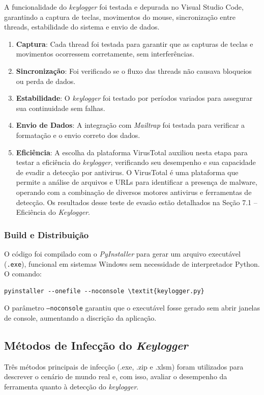 \documentclass[12pt]{article}
\begin{document}
A funcionalidade do \textit{keylogger} foi testada e depurada no Visual Studio Code, garantindo a captura de teclas, movimentos do mouse, sincronização entre threads, estabilidade do sistema e envio de dados.

\begin{enumerate}
    \item \textbf{Captura}: Cada thread foi testada para garantir que as capturas de teclas e movimentos ocorressem corretamente, sem interferências.
    \item \textbf{Sincronização}: Foi verificado se o fluxo das threads não causava bloqueios ou perda de dados.
    \item \textbf{Estabilidade}: O \textit{keylogger} foi testado por períodos variados para assegurar sua continuidade sem falhas.
    \item \textbf{Envio de Dados}: A integração com \textit{Mailtrap} foi testada para verificar a formatação e o envio correto dos dados.
    \item \textbf{Eficiência}: A escolha da plataforma VirusTotal auxiliou nesta 
    etapa para testar a eficiência do \textit{keylogger}, verificando seu desempenho e 
    sua capacidade de evadir a detecção por antivirus. O VirusTotal é uma plataforma 
    que permite a análise de arquivos e URLs para identificar a presença de malware, 
    operando com a combinação de diversos motores antivirus e ferramentas de detecção.
    Os resultados desse teste de evasão estão detalhados na Seção 7.1 – Eficiência do \textit{Keylogger}.
\end{enumerate}

\subsubsection{Build e Distribuição}

O código foi compilado com o \textit{PyInstaller} para gerar um arquivo executável (\texttt{.exe}), funcional em sistemas Windows sem necessidade de interpretador Python. O comando:

\begin{verbatim} 
pyinstaller --onefile --noconsole \textit{keylogger.py} 
\end{verbatim}

O parâmetro \texttt{--noconsole} garantiu que o executável fosse gerado sem abrir janelas de console, aumentando a discrição da aplicação.

\subsection{Métodos de Infecção do \textit{Keylogger}}
Três métodos principais de infecção (.exe, .zip e .xlsm) 
foram utilizados para descrever o cenário de mundo real e, com isso, 
avaliar o desempenho da ferramenta quanto à detecção do \textit{keylogger}.
\end{document}
